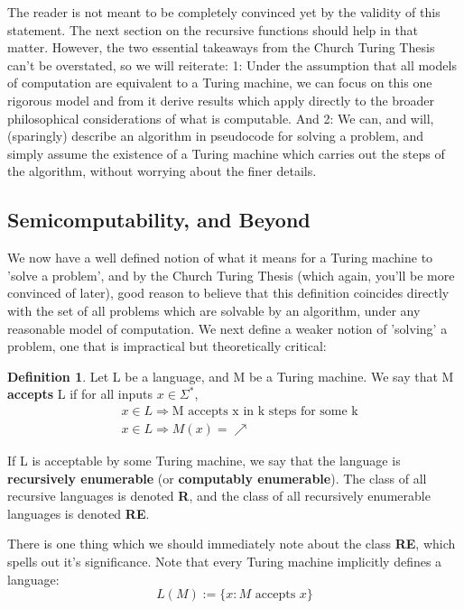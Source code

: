 \documentclass{article}
\theoremstyle{definition}
\newtheorem{definition}{Definition}[section]
\theoremstyle{plain}
\theoremstyle{theorem}
\begin{document}
The reader is not meant to be completely convinced yet by the validity of this statement. The next section on the recursive functions should help in that matter. However, the two essential takeaways from the Church Turing Thesis can't be overstated, so we will reiterate: 1: Under the assumption that all models of computation are equivalent to a Turing machine, we can focus on this one rigorous model and from it derive results which apply directly to the broader philosophical considerations of what is computable. And 2: We can, and will, (sparingly) describe an algorithm in pseudocode for solving a problem, and simply assume the existence of a Turing machine which carries out the steps of the algorithm, without worrying about the finer details.
\subsection{Semicomputability, and Beyond}
\par We now have a well defined notion of what it means for a Turing machine to 'solve a problem', and by the Church Turing Thesis (which again, you'll be more convinced of later), good reason to believe that this definition coincides directly with the set of all problems which are solvable by an algorithm, under any reasonable model of computation. We next define a weaker notion of 'solving' a problem, one that is impractical but theoretically critical: 
\begin{definition}
Let L be a language, and M be a Turing machine. We say that M \textbf{accepts} L if for all inputs $x\in\Sigma^*$,
\begin{align*}
    & x \in L \Rightarrow \textrm{M accepts x in k steps for some k} \\
    & x \in L \Rightarrow M(x)=\nearrow                     
\end{align*}
\end{definition}
If L is acceptable by some Turing machine, we say that the language is \textbf{recursively enumerable} (or \textbf{computably enumerable}). The class of all recursive languages is denoted \textbf{R}, and the class of all recursively enumerable languages is denoted \textbf{RE}.
\par
There is one thing which we should immediately note about the class \textbf{RE}, which spells out it's significance. Note that every Turing machine implicitly defines a language:
\[ L(M) := \{x: M\textrm{ accepts }x\} \]
\end{document}
